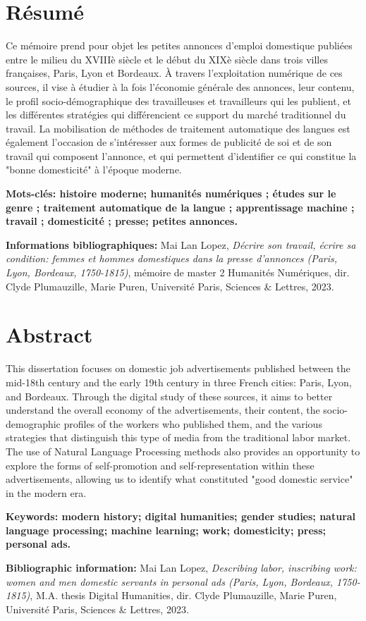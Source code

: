\section*{Résumé}

Ce mémoire prend pour objet les petites annonces d'emploi domestique publiées entre le milieu du XVIIIè siècle et le début du XIXè siècle dans trois villes françaises, Paris, Lyon et Bordeaux. À travers l'exploitation numérique de ces sources, il vise à étudier à la fois l'économie générale des annonces, leur contenu, le profil socio-démographique des travailleuses et travailleurs qui les publient, et les différentes stratégies qui différencient ce support du marché traditionnel du travail. La mobilisation de méthodes de traitement automatique des langues est également l'occasion de s'intéresser aux formes de publicité de soi et de son travail qui composent l'annonce, et qui permettent d'identifier ce qui constitue la "bonne domesticité" à l'époque moderne.

\medskip

\textbf{Mots-clés: histoire moderne; humanités numériques ; études sur le genre ; traitement automatique de la langue ; apprentissage machine ; travail ; domesticité ; presse; petites annonces.}

\textbf{Informations bibliographiques:} Mai Lan Lopez, \textit{Décrire son travail, écrire sa condition: femmes et hommes domestiques dans la presse d'annonces (Paris, Lyon, Bordeaux, 1750-1815)}, mémoire de master 2 \og Humanités Numériques\fg{}, dir. Clyde Plumauzille, Marie Puren, Université Paris, Sciences \& Lettres, 2023.



\section*{Abstract}

This dissertation focuses on domestic job advertisements published between the mid-18th century and the early 19th century in three French cities: Paris, Lyon, and Bordeaux. Through the digital study of these sources, it aims to better understand the overall economy of the advertisements, their content, the socio-demographic profiles of the workers who published them, and the various strategies that distinguish this type of media from the traditional labor market. The use of Natural Language Processing methods also provides an opportunity to explore the forms of self-promotion and self-representation within these advertisements, allowing us to identify what constituted "good domestic service" in the modern era.

\medskip

\textbf{Keywords: modern history; digital humanities; gender studies; natural language processing; machine learning; work; domesticity; press; personal ads.}

\textbf{Bibliographic information:} Mai Lan Lopez, \textit{Describing labor, inscribing work: women and men domestic servants in personal ads (Paris, Lyon, Bordeaux, 1750-1815)}, M.A. thesis \og Digital Humanities\fg{}, dir. Clyde Plumauzille, Marie Puren, Université Paris, Sciences \& Lettres, 2023.


\clearpage